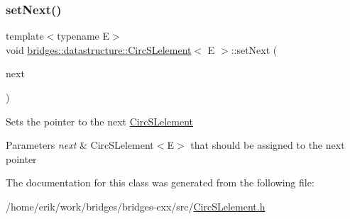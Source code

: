 \subsubsection{\texorpdfstring{set\+Next()}{setNext()}}
{\footnotesize\ttfamily template$<$typename E$>$ \\
void \hyperlink{classbridges_1_1datastructure_1_1_circ_s_lelement}{bridges\+::datastructure\+::\+Circ\+S\+Lelement}$<$ E $>$\+::set\+Next (\begin{DoxyParamCaption}\item[{\hyperlink{classbridges_1_1datastructure_1_1_circ_s_lelement}{Circ\+S\+Lelement}$<$ E $>$ $\ast$}]{next }\end{DoxyParamCaption})\hspace{0.3cm}{\ttfamily [inline]}}

Sets the pointer to the next \hyperlink{classbridges_1_1datastructure_1_1_circ_s_lelement}{Circ\+S\+Lelement} 
\begin{DoxyParams}{Parameters}
{\em next} & Circ\+S\+Lelement$<$\+E$>$ that should be assigned to the next pointer \\
\hline
\end{DoxyParams}


The documentation for this class was generated from the following file\+:\begin{DoxyCompactItemize}
\item 
/home/erik/work/bridges/bridges-\/cxx/src/\hyperlink{_circ_s_lelement_8h}{Circ\+S\+Lelement.\+h}\end{DoxyCompactItemize}
